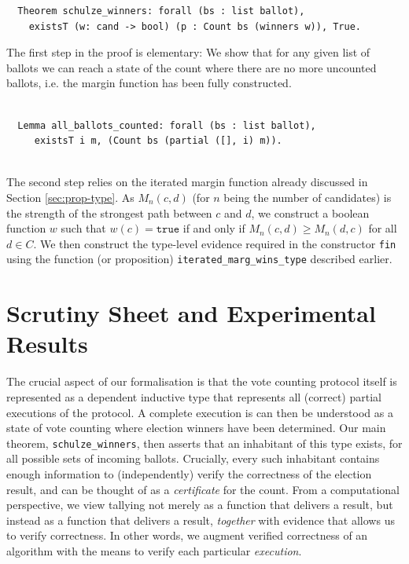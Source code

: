 \begin{verbatim}
  Theorem schulze_winners: forall (bs : list ballot),
    existsT (w: cand -> bool) (p : Count bs (winners w)), True.
\end{verbatim}


\noindent
The first step in the proof is elementary: We show that for any
given list of ballots we can reach a state of the count where there are
no more uncounted ballots, i.e. the margin function has been
fully constructed.


\begin{verbatim}

  Lemma all_ballots_counted: forall (bs : list ballot), 
     existsT i m, (Count bs (partial ([], i) m)).
        
\end{verbatim}
    
   
   
The second step relies on the iterated margin function already
discussed in Section \ref{sec:prop-type}. As $M_n(c, d)$ (for $n$ being
the number of candidates) is the strength of the strongest path
between $c$ and $d$, we construct a boolean function
$w$ such that $w(c) = \mathtt{true}$ if and only if $M_n(c, d) \geq
M_n(d, c)$ for all $d \in C$. We then construct the type-level
evidence required in the constructor \texttt{fin} 
using  the function (or proposition)
\texttt{iterated\_marg\_wins\_type} described earlier. 


\section{Scrutiny Sheet and Experimental Results}
\label{sec:scrunity_sheet}
	The crucial aspect of our formalisation is that the vote counting
protocol itself is represented as a dependent inductive type
that represents all (correct) partial executions of
the protocol.  A complete execution is can then be understood as a
state of vote counting where election winners have been determined.
Our main theorem, \texttt{schulze\_winners}, then asserts that an 
inhabitant of this type
exists, for all possible sets of incoming ballots. 
Crucially, every such inhabitant contains enough information
to (independently) verify the correctness of the election result,
and can be thought of as a \emph{certificate} for the count.
From a computational perspective, we view tallying not merely as a
function that delivers a result, but instead as a function that
delivers a result, \emph{together} with evidence that allows us to
verify correctness. In other words, we augment verified correctness
of an algorithm with the means to verify each particular
\emph{execution}.


